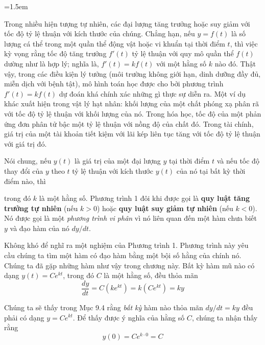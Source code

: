 \begin{list}{}{\leftmargin=156pt \rightmargin=0pt \topsep=0pt \partopsep=0pt \parsep=0pt \itemsep=0pt \listparindent=1.5em}
\item\relax
Trong nhiều hiện tượng tự nhiên, các đại lượng tăng trưởng hoặc suy giảm với tốc độ tỷ lệ thuận với kích thước của chúng. Chẳng hạn, nếu $y = f(t)$ là số lượng cá thể trong một quần thể động vật hoặc vi khuẩn tại thời điểm $t$, thì việc kỳ vọng rằng tốc độ tăng trưởng $f'(t)$ tỷ lệ thuận với quy mô quần thể $f(t)$ dường như là hợp lý; nghĩa là, $f'(t) = kf(t)$ với một hằng số $k$ nào đó. Thật vậy, trong các điều kiện lý tưởng (môi trường không giới hạn, dinh dưỡng đầy đủ, miễn dịch với bệnh tật), mô hình toán học được cho bởi phương trình $f'(t) = kf(t)$ dự đoán khá chính xác những gì thực sự diễn ra. Một ví dụ khác xuất hiện trong vật lý hạt nhân: khối lượng của một chất phóng xạ phân rã với tốc độ tỷ lệ thuận với khối lượng của nó. Trong hóa học, tốc độ của một phản ứng đơn phân tử bậc một tỷ lệ thuận với nồng độ của chất đó. Trong tài chính, giá trị của một tài khoản tiết kiệm với lãi kép liên tục tăng với tốc độ tỷ lệ thuận với giá trị đó.

\vspace{6pt}
Nói chung, nếu $y(t)$ là giá trị của một đại lượng $y$ tại thời điểm $t$ và nếu tốc độ thay đổi của $y$ theo $t$ tỷ lệ thuận với kích thước $y(t)$ của nó tại bất kỳ thời điểm nào, thì

\vspace{5pt}
\noindent{}%
\hfill
{}%
\hfill\mbox{}
\vspace{5pt}

\noindent trong đó $k$ là một hằng số. Phương trình 1 đôi khi được gọi là \textbf{quy luật tăng trưởng tự nhiên} (nếu $k > 0$) hoặc \textbf{quy luật suy giảm tự nhiên} (nếu $k < 0$). Nó được gọi là một \textit{phương trình vi phân} vì nó liên quan đến một hàm chưa biết $y$ và đạo hàm của nó $dy/dt$.

\vspace{6pt}
Không khó để nghĩ ra một nghiệm của Phương trình 1. Phương trình này yêu cầu chúng ta tìm một hàm có đạo hàm bằng một bội số hằng của chính nó. Chúng ta đã gặp những hàm như vậy trong chương này. Bất kỳ hàm mũ nào có dạng $y(t) = C e^{kt}$, trong đó $C$ là một hằng số, đều thỏa mãn
\[
\frac{dy}{dt} = C(k e^{kt}) = k(C e^{kt}) = ky
\]

\noindent Chúng ta sẽ thấy trong Mục 9.4 rằng \textit{bất kỳ} hàm nào thỏa mãn $dy/dt = ky$ đều phải có dạng $y = C e^{kt}$. Để thấy được ý nghĩa của hằng số $C$, chúng ta nhận thấy rằng
\[
y(0) = C e^{k \cdot 0} = C
\]
\end{list}
